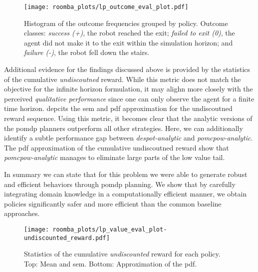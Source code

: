 \begin{figure}[htpb]
  \centering
  \texttt{[image: roomba\_plots/lp\_outcome\_eval\_plot.pdf]}
	\caption{Histogram of the outcome frequencies grouped by policy. Outcome
			     classes: \emph{success (+)}, the robot reached the exit; \emph{failed to
				   exit (0)}, the agent did not make it to the exit within the simulation horizon;
		 	 	   and \emph{failure (-)}, the robot fell down the stairs.}
	\label{fig:lp_outcome}
\end{figure}

Additional evidence for the findings discussed above is provided by the
statistics of the cumulative \emph{undiscoutned} reward. While this metric does
not match the objective for the infinite horizon formulation, it may alighn more closely with the
perceived \emph{qualitative performance} since one can only observe the agent
for a finite time horizon.  depcits the \ac{sem}
and \ac{pdf} approximation for the undiscoutned reward sequence. Using this
metric, it becomes clear that the analytic versions of the \ac{pomdp} planners
outperform all other strategies. Here, we can additionally identify a subtle
performance gap between \emph{\ac{despot}-analytic} and
\emph{\ac{pomcpow}-analytic}. The \ac{pdf} approximation of the
cumulative undiscoutned reward show that \emph{\ac{pomcpow}-analytic} manages
to eliminate large parts of the low value tail.

In summary we can state that for this problem we were able to generate robust
and efficient behaviors through \ac{pomdp} planning. We show that by carefully
integrating domain knowledge in a computationally efficient manner, we obtain
policies significantly safer and more efficient than the common baseline
approaches.

\begin{figure}[htpb]
  \centering
  \texttt{[image: roomba\_plots/lp\_value\_eval\_plot-undiscounted\_reward.pdf]}
  \caption{Statistics of the cumulative \emph{undiscounted} reward for each
  policy. Top: Mean and \acf{sem}. Bottom: Approximation of the \acf{pdf}.}
  \label{fig:lp_eval_undiscounted}
\end{figure}


